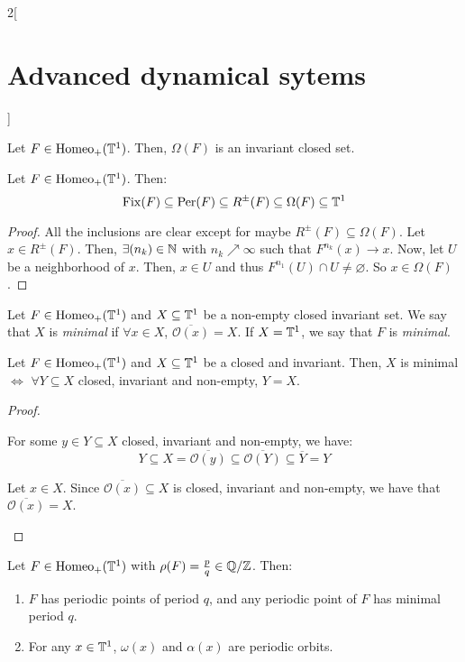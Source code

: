 \documentclass[../../../main_math.tex]{subfiles}
\begin{document}
\begin{multicols}{2}[\section{Advanced dynamical sytems}]
  \begin{proposition}
    Let $F\in \mathrm{Homeo}_+(\mathbb{T}^1)$. Then, $\Omega(F)$ is an invariant closed set.
  \end{proposition}
  \begin{lemma}
    Let $F \in \mathrm{Homeo}_+(\mathbb{T}^1)$. Then:
    $$
      \mathrm{Fix}(F)\subseteq \operatorname{Per}(F)\subseteq R^\pm(F)\subseteq \Omega(F)\subseteq \mathbb{T}^1
    $$
  \end{lemma}
  \begin{proof}
    All the inclusions are clear except for maybe $R^\pm(F)\subseteq \Omega(F)$. Let $x\in R^\pm(F)$. Then, $\exists (n_k)\in\mathbb{N}$ with $n_k \nearrow \infty$ such that $F^{n_k}(x)\to x$. Now, let $U$ be a neighborhood of $x$. Then, $x\in U$ and thus $F^{n_1}(U)\cap U\ne\varnothing$. So $x\in \Omega(F)$.
  \end{proof}
  \begin{definition}
    Let $F\in \mathrm{Homeo}_+(\mathbb{T}^1)$ and $X\subseteq \mathbb{T}^1$ be a non-empty closed invariant set. We say that $X$ is \emph{minimal} if $\forall x\in X$, $\overline{\mathcal{O}(x)}=X$. If $X=\mathbb{T}^1$, we say that $F$ is \emph{minimal}.
  \end{definition}
  \begin{proposition}
    Let $F\in \mathrm{Homeo}_+(\mathbb{T}^1)$ and $X\subseteq \mathbb{T}^1$ be a closed and invariant. Then, $X$ is minimal $\iff$ $\forall Y\subseteq X$ closed, invariant and non-empty, $Y=X$.
  \end{proposition}
  \begin{proof}
    \begin{itemizeiff}
      For some $y\in Y\subseteq X$ closed, invariant and non-empty, we have:
      $$Y\subseteq X = \overline{\mathcal{O}(y)}\subseteq \overline{\mathcal{O}(Y)}\subseteq \overline{Y}=Y$$
      \item Let $x\in X$. Since $\overline{\mathcal{O}(x)}\subseteq X$ is closed, invariant and non-empty, we have that $\overline{\mathcal{O}(x)}=X$.
    \end{itemizeiff}
  \end{proof}
  \begin{theorem}
    Let $F\in \mathrm{Homeo}_+(\mathbb{T}^1)$ with $\rho(F)=\frac{p}{q}\in \quot{\QQ}{\ZZ}$. Then:
    \begin{enumerate}
      \item $F$ has periodic points of period $q$, and any periodic point of $F$ has minimal period $q$.
      \item For any $x\in \mathbb{T}^1$, $\omega(x)$ and $\alpha(x)$ are periodic orbits.
    \end{enumerate}

\end{theorem}
\end{multicols}
\end{document}
